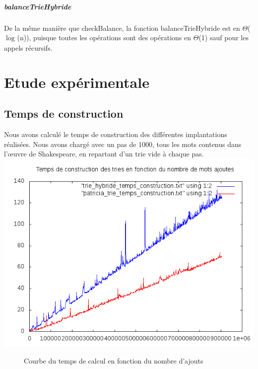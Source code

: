 \documentclass[a4paper,12pt]{report}
\begin{document}
\paragraph{balanceTrieHybride}
De la même manière que checkBalance, la fonction balanceTrieHybride est en $\Theta$($\log_{}$(n)), puisque toutes les opérations
sont des opérations en $\Theta$(1) sauf pour les appels récursifs.

\chapter{Etude expérimentale}
\section{Temps de construction}
Nous avons calculé le temps de construction des différentes implantations réalisées. Nous avons chargé avec un pas de 1000,
tous les mots contenus dans l’œuvre de Shakespeare, en repartant d'un trie vide à chaque pas.\\
\includegraphics{../comparaison/courbe_temps_construction.png}
\begin{figure}[!htbp]
\caption{Courbe du temps de calcul en fonction du nombre d'ajouts}
\end{figure}
\end{document}
